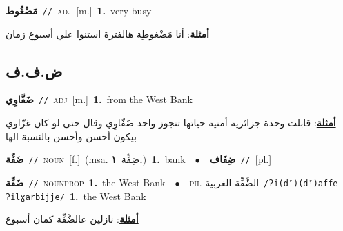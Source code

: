 \documentclass[10pt,a4paper,twoside]{article} %
\begin{document}
\begin{multicols}{2}
{\setlength\topsep{0pt}\textbf{\foreignlanguage{arabic}{مَضْغُوط}}\ {\color{gray}\texttt{//}\color{black}}\ \textsc{adj}\ [m.]\ \textbf{1.}~very busy\  \begin{flushright}\color{gray}\foreignlanguage{arabic}{\textbf{\underline{\foreignlanguage{arabic}{أمثلة}}}: أنا مَضْغوطِة هالفترة استنوا علي أسبوع زمان}\end{flushright}\color{black}} \vspace{2mm}

\vspace{-3mm}
\subsection*{\color{blue}\foreignlanguage{arabic}{ض.ف.ف}\color{blue}{}} 

{\setlength\topsep{0pt}\textbf{\foreignlanguage{arabic}{ضَفَّاوِي}}\ {\color{gray}\texttt{//}\color{black}}\ \textsc{adj}\ [m.]\ \textbf{1.}~from the West Bank\  \begin{flushright}\color{gray}\foreignlanguage{arabic}{\textbf{\underline{\foreignlanguage{arabic}{أمثلة}}}: قابلت وحدة جزائرية أمنية حياتها تتجوز واحد ضَفّاوِي وقال حتى لو كان غزّاوي بيكون أحسن وأحسن بالنسبة الها}\end{flushright}\color{black}} \vspace{2mm}

{\setlength\topsep{0pt}\textbf{\foreignlanguage{arabic}{ضَفِّة}}\ {\color{gray}\texttt{//}\color{black}}\ \textsc{noun}\ [f.]\ \color{gray}(msa. \foreignlanguage{arabic}{ضِفِّة}~\foreignlanguage{arabic}{\textbf{١.}})\color{black}\ \textbf{1.}~bank\ \ $\bullet$\ \ \setlength\topsep{0pt}\textbf{\foreignlanguage{arabic}{ضِفَاف}}\ {\color{gray}\texttt{//}\color{black}}\ [pl.]\ } \vspace{2mm}

{\setlength\topsep{0pt}\textbf{\foreignlanguage{arabic}{ضَفِّة}}\ {\color{gray}\texttt{//}\color{black}}\ \textsc{noun\textunderscore prop}\ \textbf{1.}~the West Bank\ \ $\bullet$\ \ \textsc{ph.} \color{gray} \foreignlanguage{arabic}{الضَّفِّة الغربية}\color{black}\ {\color{gray}\texttt{/{\sffamily ʔi(dˤ)(dˤ)affe ʔilɣarbijje}/}\color{black}}\ \textbf{1.}~the West Bank\  \begin{flushright}\color{gray}\foreignlanguage{arabic}{\textbf{\underline{\foreignlanguage{arabic}{أمثلة}}}: نازلين عالضَّفِّة كمان أسبوع}\end{flushright}\color{black}} \vspace{2mm}


\end{multicols}
\end{document}
